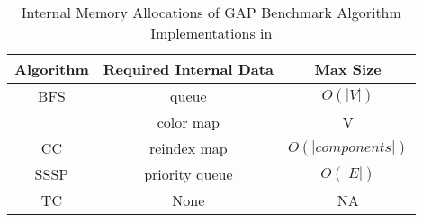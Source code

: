 \begin{table}[h!]
\centering
\begin{tabular}{| c | c | c |}
\hline
Algorithm & Required Internal Data & Max Size \\\hline
BFS       & queue          & $O(|V|)$ \\
          & color map      & V \\\hline
CC        & reindex map    & $O(|components|)$ \\\hline
SSSP      & priority queue & $O(|E|)$\\\hline
TC        & None           & N\/A\\
\hline
\end{tabular}
\caption{Internal Memory Allocations of GAP Benchmark Algorithm Implementations in \stdgraph}
\label{tab:internalmem}
\end{table}

